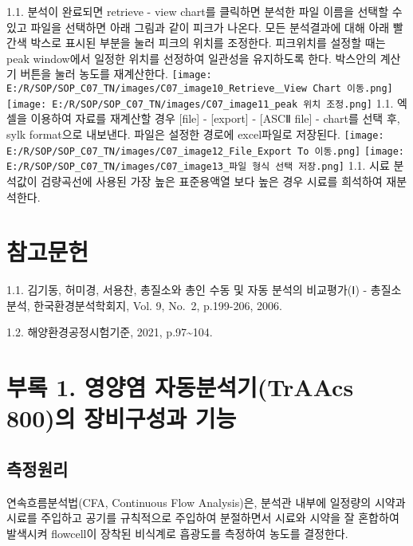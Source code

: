 \documentclass[
]{book}
\begin{document}
1.1. 분석이 완료되면 retrieve - view chart를 클릭하면 분석한 파일 이름을 선택할 수 있고 파일을 선택하면 아래 그림과 같이 피크가 나온다. 모든 분석결과에 대해 아래 빨간색 박스로 표시된 부분을 눌러 피크의 위치를 조정한다. 피크위치를 설정할 때는 peak window에서 일정한 위치를 선정하여 일관성을 유지하도록 한다. 박스안의 계산기 버튼을 눌러 농도를 재계산한다.
\texttt{[image: E:/R/SOP/SOP\_C07\_TN/images/C07\_image10\_Retrieve＿View Chart 이동.png]}
\texttt{[image: E:/R/SOP/SOP\_C07\_TN/images/C07\_image11\_peak 위치 조정.png]}
1.1. 엑셀을 이용하여 자료를 재계산할 경우 {[}file{]} - {[}export{]} - {[}ASCⅡ file{]} - chart를 선택 후, sylk format으로 내보낸다. 파일은 설정한 경로에 excel파일로 저장된다.
\texttt{[image: E:/R/SOP/SOP\_C07\_TN/images/C07\_image12\_File\_Export To 이동.png]}
\texttt{[image: E:/R/SOP/SOP\_C07\_TN/images/C07\_image13\_파일 형식 선택 저장.png]}
1.1. 시료 분석값이 검량곡선에 사용된 가장 높은 표준용액열 보다 높은 경우 시료를 희석하여 재분석한다.

\hypertarget{uxcc38uxace0uxbb38uxd5cc-5}{%
\section{참고문헌}\label{uxcc38uxace0uxbb38uxd5cc-5}}

1.1. 김기동, 허미경, 서용찬, 총질소와 총인 수동 및 자동 분석의 비교평가(Ⅰ) - 총질소분석, 한국환경분석학회지, Vol. 9, No.~2, p.199-206, 2006.

1.2. 해양환경공정시험기준, 2021, p.97\textasciitilde104.

\hypertarget{uxbd80uxb85d-1.-uxc601uxc591uxc5fc-uxc790uxb3d9uxbd84uxc11duxae30traacs-800uxc758-uxc7a5uxbe44uxad6cuxc131uxacfc-uxae30uxb2a5}{%
\section{부록 1. 영양염 자동분석기(TrAAcs 800)의 장비구성과 기능}\label{uxbd80uxb85d-1.-uxc601uxc591uxc5fc-uxc790uxb3d9uxbd84uxc11duxae30traacs-800uxc758-uxc7a5uxbe44uxad6cuxc131uxacfc-uxae30uxb2a5}}

\hypertarget{uxce21uxc815uxc6d0uxb9ac-2}{%
\subsection{측정원리}\label{uxce21uxc815uxc6d0uxb9ac-2}}

연속흐름분석법(CFA, Continuous Flow Analysis)은, 분석관 내부에 일정량의 시약과 시료를 주입하고 공기를 규칙적으로 주입하여 분절하면서 시료와 시약을 잘 혼합하여 발색시켜 flowcell이 장착된 비식계로 흡광도를 측정하여 농도를 결정한다.
\end{document}
